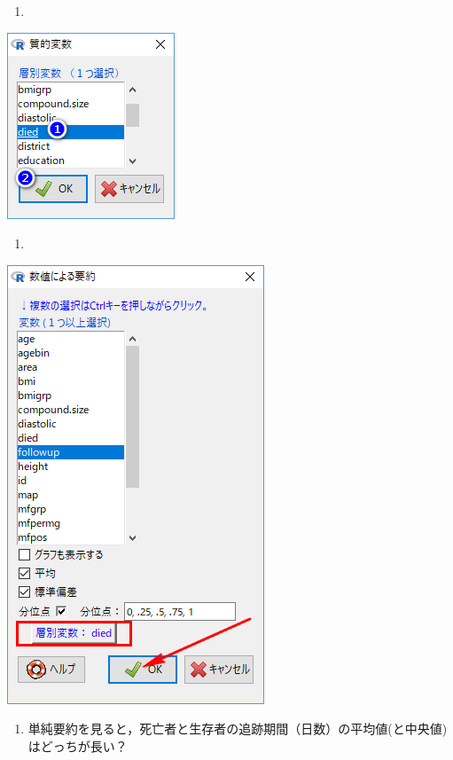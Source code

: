 \documentclass[11pt,]{problemset}
\providecommand{\tightlist}{%
  \setlength{\itemsep}{0pt}\setlength{\parskip}{0pt}}
\begin{document}
\newpage

\begin{enumerate}
\def\labelenumi{\arabic{enumi}.}
\setcounter{enumi}{4}
\item
\end{enumerate}

\begin{center}\includegraphics[width=0.25\linewidth,height=0.35\textheight]{pic/survival04} \end{center}

\begin{enumerate}
\def\labelenumi{\arabic{enumi}.}
\setcounter{enumi}{5}
\item
\end{enumerate}

\begin{center}\includegraphics[width=0.45\linewidth,height=0.35\textheight]{pic/survival05} \end{center}

\begin{enumerate}
\def\labelenumi{\arabic{enumi}.}
\setcounter{enumi}{6}
\tightlist
\item
  単純要約を見ると，死亡者と生存者の追跡期間（日数）の平均値(と中央値)はどっちが長い？
\end{enumerate}
\end{document}

